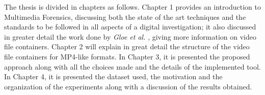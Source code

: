 The thesis is divided in chapters as follows. Chapter 1 provides an introduction to Multimedia Forensics, discussing both the state of the art techniques and the standards to be followed in all aspects of a digital investigation; it also discussed in greater detail the work done by \emph{Gloe et al.} \cite{Gloe2014S68}, giving more information on video file containers. Chapter 2 will explain in great detail the structure of the video file containers for MP4-like formats. In Chapter 3, it is presented the proposed approach along with all the choices made and the details of the implemented tool. In Chapter 4, it is presented the dataset used, the motivation and the organization of the experiments along with a discussion of the results obtained.